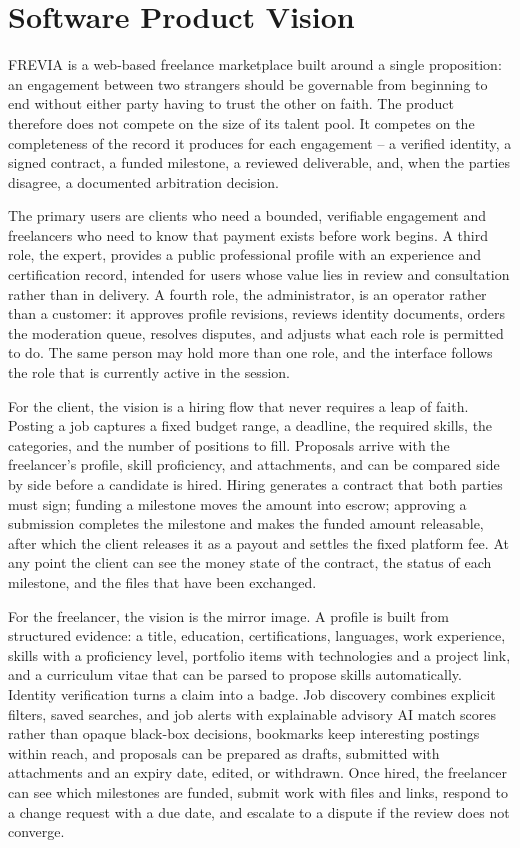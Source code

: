 \section{Software Product Vision}

FREVIA is a web-based freelance marketplace built around a single proposition: an engagement between two strangers should be governable from beginning to end without either party having to trust the other on faith. The product therefore does not compete on the size of its talent pool. It competes on the completeness of the record it produces for each engagement -- a verified identity, a signed contract, a funded milestone, a reviewed deliverable, and, when the parties disagree, a documented arbitration decision.

The primary users are clients who need a bounded, verifiable engagement and freelancers who need to know that payment exists before work begins. A third role, the expert, provides a public professional profile with an experience and certification record, intended for users whose value lies in review and consultation rather than in delivery. A fourth role, the administrator, is an operator rather than a customer: it approves profile revisions, reviews identity documents, orders the moderation queue, resolves disputes, and adjusts what each role is permitted to do. The same person may hold more than one role, and the interface follows the role that is currently active in the session.

For the client, the vision is a hiring flow that never requires a leap of faith. Posting a job captures a fixed budget range, a deadline, the required skills, the categories, and the number of positions to fill. Proposals arrive with the freelancer's profile, skill proficiency, and attachments, and can be compared side by side before a candidate is hired. Hiring generates a contract that both parties must sign; funding a milestone moves the amount into escrow; approving a submission completes the milestone and makes the funded amount releasable, after which the client releases it as a payout and settles the fixed platform fee. At any point the client can see the money state of the contract, the status of each milestone, and the files that have been exchanged.

For the freelancer, the vision is the mirror image. A profile is built from structured evidence: a title, education, certifications, languages, work experience, skills with a proficiency level, portfolio items with technologies and a project link, and a curriculum vitae that can be parsed to propose skills automatically. Identity verification turns a claim into a badge. Job discovery combines explicit filters, saved searches, and job alerts with explainable advisory AI match scores rather than opaque black-box decisions, bookmarks keep interesting postings within reach, and proposals can be prepared as drafts, submitted with attachments and an expiry date, edited, or withdrawn. Once hired, the freelancer can see which milestones are funded, submit work with files and links, respond to a change request with a due date, and escalate to a dispute if the review does not converge.

